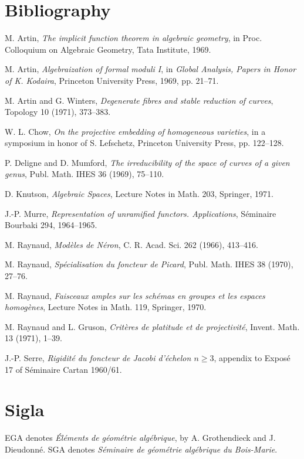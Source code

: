 \section*{Bibliography}
\begin{enumerate}[label={[\arabic*]}]
\item M. Artin, \emph{The implicit function theorem in algebraic geometry}, in Proc. Colloquium on Algebraic Geometry, Tata Institute, 1969.
\item M. Artin, \emph{Algebraization of formal moduli I}, in \emph{Global Analysis, Papers in Honor of K. Kodaira}, Princeton University Press, 1969, pp. 21--71.
\item M. Artin and G. Winters, \emph{Degenerate fibres and stable reduction of curves}, Topology 10 (1971), 373--383.
\item W. L. Chow, \emph{On the projective embedding of homogeneous varieties}, in a symposium in honor of S. Lefschetz, Princeton University Press, pp. 122--128.
\item P. Deligne and D. Mumford, \emph{The irreducibility of the space of curves of a given genus}, Publ. Math. IHES 36 (1969), 75--110.
\item D. Knutson, \emph{Algebraic Spaces}, Lecture Notes in Math. 203, Springer, 1971.
\item J.-P. Murre, \emph{Representation of unramified functors. Applications}, Séminaire Bourbaki 294, 1964--1965.
\item M. Raynaud, \emph{Modèles de Néron}, C. R. Acad. Sci. 262 (1966), 413--416.
\item M. Raynaud, \emph{Spécialisation du foncteur de Picard}, Publ. Math. IHES 38 (1970), 27--76.
\item M. Raynaud, \emph{Faisceaux amples sur les schémas en groupes et les espaces homogènes}, Lecture Notes in Math. 119, Springer, 1970.
\item M. Raynaud and L. Gruson, \emph{Critères de platitude et de projectivité}, Invent. Math. 13 (1971), 1--39.
\item J.-P. Serre, \emph{Rigidité du foncteur de Jacobi d'échelon $n\ge3$}, appendix to Exposé 17 of Séminaire Cartan 1960/61.
\end{enumerate}

\section*{Sigla}
EGA denotes \emph{Éléments de géométrie algébrique}, by A. Grothendieck and J. Dieudonné. SGA denotes \emph{Séminaire de géométrie algébrique du Bois-Marie}.


